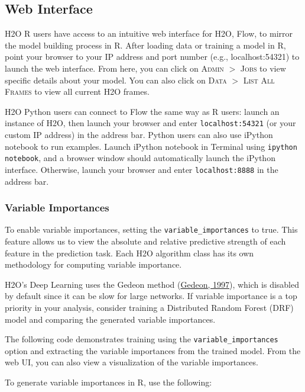 {{\subsection{Web Interface} 

H2O R users have access to an intuitive web interface for H2O, Flow, to mirror the model building process in R. After loading data or training a model in R, point your browser to your IP address and port number (e.g., localhost:54321) to launch the web interface. From here, you can click on \textsc{Admin} $>$ \textsc{Jobs} to view specific details about your model. You can also click on \textsc{Data} $>$ \textsc{List All Frames} to view all current H2O frames. 

H2O Python users can connect to Flow the same way as R users: launch an instance of H2O, then launch your browser and enter \texttt{localhost:54321} (or your custom IP address) in the address bar. Python users can also use iPython notebook to run examples. Launch iPython notebook in Terminal using \texttt{ipython notebook}, and a browser window should automatically launch the iPython interface. Otherwise, launch your browser and enter \texttt{localhost:8888} in the address bar. 
\newpage
\subsubsection{Variable Importances} 

To enable variable importances, setting the \texttt{variable\_importances} to true. This feature allows us to view the absolute and relative predictive strength of each feature in the prediction task.  Each H2O algorithm class has its own methodology for computing variable importance.  

H2O's Deep Learning uses the Gedeon method (\href{http://cs.anu.edu.au/people/Tom.Gedeon/pdfs/ContribDataMinv2.pdf}{Gedeon, 1997}), which is disabled by default since it can be slow for large networks.  If variable importance is a top priority in your analysis, consider training a Distributed Random Forest (DRF) model and comparing the generated variable importances.

The following code demonstrates training using the \texttt{variable\_importances} option and extracting the variable importances from the trained model.  From the web UI, you can also view a visualization of the variable importances.

\waterExampleInR
To generate variable importances in R, use the following: 

}}
